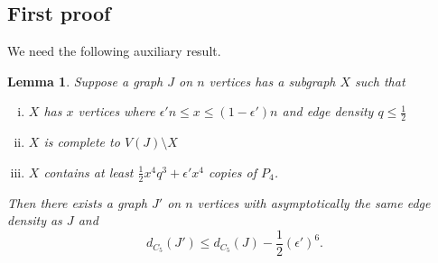\documentclass[12pt]{article}
\newcommand{\eps}{\epsilon}
\newtheorem{lemma}[theorem]{Lemma}
\theoremstyle{definition}
\theoremstyle{remark}
\renewcommand{\le}{\leqslant}
\begin{document}
\subsection{First proof}

We need the following auxiliary result.

\begin{lemma}\label{lem:tech}
Suppose a graph $J$ on $n$ vertices has a subgraph $X$ such that 
\begin{enumerate}[(i)]
\item \label{cond1} $X$ has $x$ vertices where $\eps' n \le x \le (1-\eps')n$ and edge density $q \le \frac{1}{2}$
\item \label{cond2}$X$ is complete to $V(J)\setminus X$
\item \label{cond3}$X$ contains at least $\frac 12 x^4 q^3 + \eps' x^4$ copies of $P_4$.
\end{enumerate}
Then there exists a graph $J'$ on $n$ vertices with asymptotically the same edge density as $J$ and $$d_{C_5}(J') \le d_{C_5}(J) - \frac 12 (\eps')^6.$$
\end{lemma}
\end{document}
